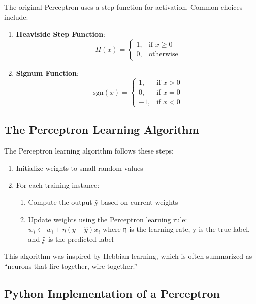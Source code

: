 \documentclass[
  letterpaper,
  DIV=11,
  numbers=noendperiod]{scrreprt}
\providecommand{\tightlist}{%
  \setlength{\itemsep}{0pt}\setlength{\parskip}{0pt}}\usepackage{longtable,booktabs,array}
\begin{document}
The original Perceptron uses a step function for activation. Common
choices include:

\begin{enumerate}
\def\labelenumi{\arabic{enumi}.}
\item
  \textbf{Heaviside Step Function}: \[H(x) = \begin{cases}
  1, & \text{if } x \geq 0 \\
  0, & \text{otherwise}
  \end{cases}\]
\item
  \textbf{Signum Function}: \[\text{sgn}(x) = \begin{cases}
  1, & \text{if } x > 0 \\
  0, & \text{if } x = 0 \\
  -1, & \text{if } x < 0
  \end{cases}\]
\end{enumerate}

\subsection{The Perceptron Learning
Algorithm}\label{the-perceptron-learning-algorithm}

The Perceptron learning algorithm follows these steps:

\begin{enumerate}
\def\labelenumi{\arabic{enumi}.}
\tightlist
\item
  Initialize weights to small random values
\item
  For each training instance:

  \begin{enumerate}
  \def\labelenumii{\alph{enumii}.}
  \tightlist
  \item
    Compute the output ŷ based on current weights
  \item
    Update weights using the Perceptron learning rule:
    \(w_i \leftarrow w_i + \eta (y - \hat{y}) x_i\) where η is the
    learning rate, y is the true label, and ŷ is the predicted label
  \end{enumerate}
\end{enumerate}

This algorithm was inspired by Hebbian learning, which is often
summarized as ``neurons that fire together, wire together.''

\subsection{Python Implementation of a
Perceptron}\label{python-implementation-of-a-perceptron}
\end{document}

